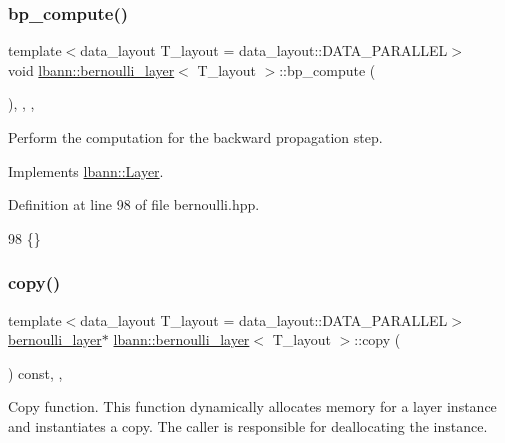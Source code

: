 \subsubsection{\texorpdfstring{bp\+\_\+compute()}{bp\_compute()}}
{\footnotesize\ttfamily template$<$data\+\_\+layout T\+\_\+layout = data\+\_\+layout\+::\+D\+A\+T\+A\+\_\+\+P\+A\+R\+A\+L\+L\+EL$>$ \\
void \hyperlink{classlbann_1_1bernoulli__layer}{lbann\+::bernoulli\+\_\+layer}$<$ T\+\_\+layout $>$\+::bp\+\_\+compute (\begin{DoxyParamCaption}{ }\end{DoxyParamCaption})\hspace{0.3cm}{\ttfamily [inline]}, {\ttfamily [override]}, {\ttfamily [protected]}, {\ttfamily [virtual]}}

Perform the computation for the backward propagation step. 

Implements \hyperlink{classlbann_1_1Layer_a7442e01f9ee1294df2de811efcf5171e}{lbann\+::\+Layer}.



Definition at line 98 of file bernoulli.\+hpp.


\begin{DoxyCode}
98 \{\}
\end{DoxyCode}
\mbox{\label{classlbann_1_1bernoulli__layer_acf1c58e256f8f5c494a15be4537cdb37}} 
\subsubsection{\texorpdfstring{copy()}{copy()}}
{\footnotesize\ttfamily template$<$data\+\_\+layout T\+\_\+layout = data\+\_\+layout\+::\+D\+A\+T\+A\+\_\+\+P\+A\+R\+A\+L\+L\+EL$>$ \\
\hyperlink{classlbann_1_1bernoulli__layer}{bernoulli\+\_\+layer}$\ast$ \hyperlink{classlbann_1_1bernoulli__layer}{lbann\+::bernoulli\+\_\+layer}$<$ T\+\_\+layout $>$\+::copy (\begin{DoxyParamCaption}{ }\end{DoxyParamCaption}) const\hspace{0.3cm}{\ttfamily [inline]}, {\ttfamily [override]}, {\ttfamily [virtual]}}

Copy function. This function dynamically allocates memory for a layer instance and instantiates a copy. The caller is responsible for deallocating the instance. 

